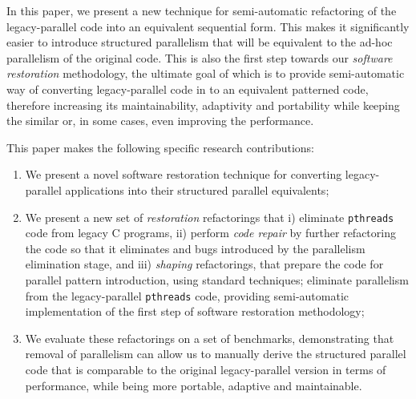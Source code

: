In this paper, we present a new technique for semi-automatic refactoring of the legacy-parallel code into an equivalent sequential form. This makes it significantly easier to introduce structured parallelism that will be equivalent to the ad-hoc parallelism of the original code. This is also the first step towards our \emph{software restoration} methodology, the ultimate goal of which is to provide semi-automatic way of converting legacy-parallel code in to an equivalent patterned code, therefore increasing its maintainability, adaptivity and portability while keeping the similar or, in some cases, even improving the performance. 

This paper makes the following specific research contributions:
\begin{enumerate}
    \item We present a novel software restoration technique for converting legacy-parallel applications into their structured parallel equivalents;
    \item We present a new set of \emph{restoration} refactorings that i) eliminate \lstinline{pthreads} code from legacy C programs, ii) perform \emph{code repair} by further refactoring the code so that it eliminates and bugs introduced by the parallelism elimination stage, and iii) \emph{shaping} refactorings, that prepare the code for parallel pattern introduction, using standard techniques;
    eliminate parallelism from the legacy-parallel \lstinline{pthreads} code, providing semi-automatic implementation of the first step of software restoration methodology;
    \item We evaluate these refactorings on a set of benchmarks, demonstrating that removal of parallelism can allow us to manually derive the structured parallel code that is comparable to the original legacy-parallel version in terms of performance, while being more portable, adaptive and maintainable.
\end{enumerate}

